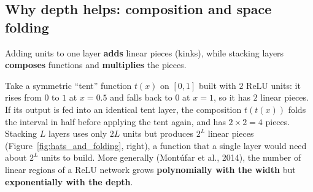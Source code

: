 \subsection{Why depth helps: composition and space folding}
Adding units to one layer \textbf{adds} linear pieces (kinks), while stacking
layers \textbf{composes} functions and \textbf{multiplies} the pieces.

Take a symmetric ``tent'' function $t(x)$ on $[0,1]$ built with $2$ ReLU units: it
rises from $0$ to $1$ at $x = 0.5$ and falls back to $0$ at $x = 1$, so it has $2$
linear pieces. If its output is fed into an identical tent layer, the composition
$t(t(x))$ folds the interval in half before applying the tent again, and has
$2 \times 2 = 4$ pieces. Stacking $L$ layers uses only $2L$ units but produces
$2^L$ linear pieces (Figure~\ref{fig:hats_and_folding}, right), a function that a
single layer would need about $2^L$ units to build. More generally
(Mont\'ufar et al., 2014), the number of linear regions of a ReLU network grows
\textbf{polynomially with the width} but \textbf{exponentially with the depth}.

